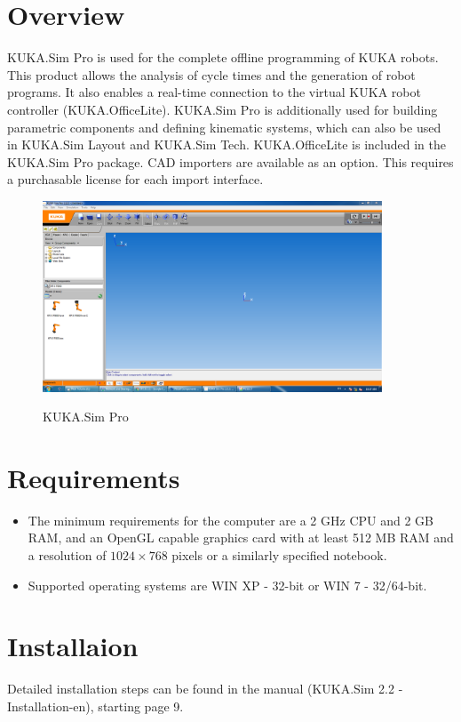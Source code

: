 \section{Overview}
KUKA.Sim Pro is used for the complete offline programming of KUKA robots. This product allows the analysis of cycle times and the generation of robot programs. It also enables a real-time connection to the virtual KUKA robot controller (KUKA.OfficeLite). KUKA.Sim Pro is additionally used for building parametric components and defining kinematic systems, which can also be used in KUKA.Sim Layout and KUKA.Sim Tech. KUKA.OfficeLite is included in the KUKA.Sim Pro package. CAD importers are available as an option. This requires a purchasable license for each import interface. 
\begin{figure}[h]
\centering
\includegraphics[width=0.9\textwidth]{figures/parts/33}
\label{fig:33}
\caption{KUKA.Sim Pro}
\end{figure}

\section{Requirements}
\begin{itemize}
	\item The minimum requirements for the computer are a 2 GHz CPU and 2 GB RAM, and an OpenGL capable graphics card with at least 512 MB RAM and a resolution of $1024 \times 768$ pixels or a similarly specified notebook.
	\item Supported operating systems are WIN XP - 32-bit or WIN 7 - 32/64-bit.
\end{itemize}

\section{Installaion}
Detailed installation steps can be found in the manual (KUKA.Sim 2.2 - Installation-en), starting page 9. 

